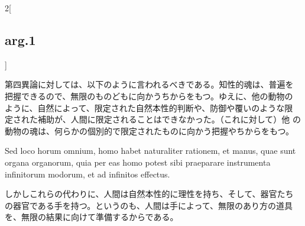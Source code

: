 \documentclass[paper=a4paper,fontsize=10pt,jafontsize=9pt,titlepage]{jlreq}
\begin{document}
\begin{paracol}{2}[\subsection{arg.1}]
\switchcolumn

第四異論に対しては、以下のように言われるべきである。知性的魂は、普遍を
把握できるので、無限のものどもに向かうちからをもつ。ゆえに、他の動物の
ように、自然によって、限定された自然本性的判断や、防御や覆いのような限
定された補助が、人間に限定されることはできなかった。（これに対して）他
の動物の魂は、何らかの個別的で限定されたものに向かう把握やちからをもつ。
 
\switchcolumn*


 Sed loco horum omnium, homo habet naturaliter rationem, et manus,
 quae sunt organa organorum, quia per eas homo potest sibi praeparare
 instrumenta infinitorum modorum, et ad infinitos effectus.

\switchcolumn

しかしこれらの代わりに、人間は自然本性的に理性を持ち、そして、器官たち
の器官である手を持つ。というのも、人間は手によって、無限のあり方の道具
を、無限の結果に向けて準備するからである。

\end{paracol}
\newpage

\end{document}
